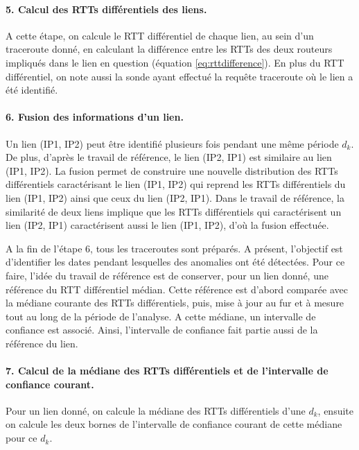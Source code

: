 \paragraph{5. Calcul des RTTs différentiels des liens.}  A cette étape, on calcule le RTT différentiel de chaque  lien, au sein d'un traceroute donné, en calculant la différence entre les RTTs des deux routeurs impliqués dans le  lien en question (équation \ref{eq:rttdifference}). En plus du RTT différentiel, on note aussi la sonde  ayant effectué la requête traceroute où le lien a été identifié. 

\paragraph{6. Fusion des informations d'un lien.} Un lien (IP1, IP2) peut être identifié plusieurs fois pendant une même période $d_k$. De plus, d'après le travail de référence,  le lien (IP2, IP1) est similaire au lien  (IP1, IP2). La fusion permet de construire une nouvelle distribution des RTTs différentiels caractérisant le lien (IP1, IP2) qui reprend les RTTs différentiels du lien (IP1, IP2) ainsi que ceux du lien (IP2, IP1). Dans le travail de référence, la similarité de deux liens  implique que les RTTs différentiels qui caractérisent un lien (IP2, IP1) caractérisent aussi le lien (IP1, IP2), d'où la fusion effectuée.


A la fin de l'étape 6, tous les traceroutes sont préparés. A présent, l'objectif est d'identifier les dates pendant lesquelles des anomalies ont été détectées. Pour ce faire, l'idée du travail de référence est de conserver, pour un lien donné, une référence du RTT différentiel médian.  Cette référence est d'abord comparée avec la médiane courante des RTTs différentiels,  puis,  mise à jour au fur et à mesure   tout au long de la période de l'analyse. A cette médiane, un intervalle de confiance est associé. Ainsi, l'intervalle de confiance fait partie aussi de la référence du lien. 


\paragraph{7. Calcul de la médiane des RTTs différentiels et  de l'intervalle de confiance courant.} Pour un lien donné, on calcule la médiane des RTTs différentiels d'une $d_k$, ensuite on calcule les deux bornes de l'intervalle de confiance  courant de cette médiane pour ce $d_k$.  




